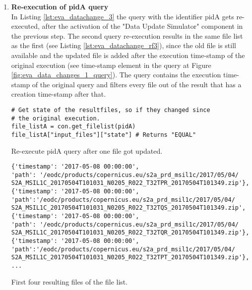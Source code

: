 \documentclass[draft,final]{vutinfth} %
\newenvironment{code}{\captionsetup{type=listing}}{}
\begin{document}
\begin{enumerate}
	\item \textbf{Re-execution of pidA query} \\
	In Listing \ref{lst:eva_datachange_3} the query with the identifier pidA gets re-executed, after the activation of the "Data Update Simulator" component in the previous step. The second query re-execution results in the same file list as the first (see Listing \ref{lst:eva_datachange_rf3}), since the old file is still available and the updated file is added after the execution time-stamp of the original execution (see time-stamp element in the query at Figure \ref{fig:eva_data_changes_1_query}). The query contains the execution time-stamp of the original query and filters every file out of the result that has a creation time-stamp after that.
	\begin{code}
		\begin{verbatim}
# Get state of the resultfiles, so if they changed since 
# the original execution. 
file_listA = con.get_filelist(pidA)
file_listA["input_files"]["state"] # Returns "EQUAL"
		\end{verbatim}
		\caption{Re-execute pidA query after one file got updated.}
		\label{lst:eva_datachange_3}
	\end{code}
	
	\begin{code}
		\begin{verbatim}
{'timestamp': '2017-05-08 00:00:00', 
'path': '/eodc/products/copernicus.eu/s2a_prd_msil1c/2017/05/04/
S2A_MSIL1C_20170504T101031_N0205_R022_T32TPR_20170504T101349.zip'}, 
{'timestamp': '2017-05-08 00:00:00',
'path':'/eodc/products/copernicus.eu/s2a_prd_msil1c/2017/05/04/
S2A_MSIL1C_20170504T101031_N0205_R022_T32TQS_20170504T101349.zip', 
{'timestamp': '2017-05-08 00:00:00', 
'path': '/eodc/products/copernicus.eu/s2a_prd_msil1c/2017/05/04/
S2A_MSIL1C_20170504T101031_N0205_R022_T32TQR_20170504T101349.zip'}, 
{'timestamp': '2017-05-08 00:00:00',
'path':'/eodc/products/copernicus.eu/s2a_prd_msil1c/2017/05/04/
S2A_MSIL1C_20170504T101031_N0205_R022_T32TPT_20170504T101349.zip'},
...
		\end{verbatim}
		\caption{First four resulting files of the file list.}
		\label{lst:eva_datachange_rf3}
	\end{code}
	

\end{enumerate}
\end{document}
